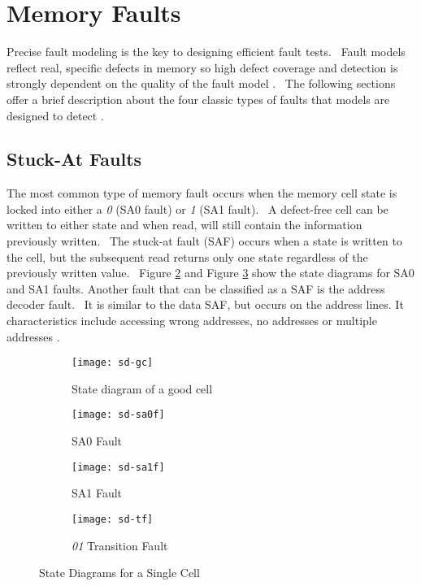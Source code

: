 \section{Memory Faults}
\label{sect:bg-faults}
Precise fault modeling is the key to designing efficient fault tests.  Fault models reflect real, specific defects in memory so high defect coverage and detection is strongly dependent on the quality of the fault model \cite{1327984}.  The following sections offer a brief description about the four classic types of faults that models are designed to detect \cite{Adams2003}.  

\subsection{Stuck-At Faults}
The most common type of memory fault occurs when the memory cell state is locked into either a \textit{0} (SA0 fault) or \textit{1} (SA1 fault).  A defect-free cell can be written to either state and when read, will still contain the information previously written.  The stuck-at fault (SAF) occurs when a state is written to the cell, but the subsequent read returns only one state regardless of the previously written value.  Figure \ref{fig:sd-sa0f} and Figure \ref{fig:sd-sa1f} show the state diagrams for SA0 and SA1 faults.  Another fault that can be classified as a SAF is the address decoder fault.  It is similar to the data SAF, but occurs on the address lines.  It characteristics include accessing wrong addresses, no addresses or multiple addresses \cite{VanDeGoor1991}.
\begin{figure}[H]
  \centering
  \begin{subfigure}[b]{0.5\textwidth}
    \texttt{[image: sd-gc]}
    \caption{State diagram of a good cell}
    \label{fig:sd-gc}
  \end{subfigure}  
  
  \begin{subfigure}[b]{0.25\textwidth}
    \texttt{[image: sd-sa0f]}
    \caption{SA0 Fault}
    \label{fig:sd-sa0f}
  \end{subfigure}  
  \begin{subfigure}[b]{0.25\textwidth}
    \texttt{[image: sd-sa1f]}
    \caption{SA1 Fault}
    \label{fig:sd-sa1f}
  \end{subfigure}  
  
  \begin{subfigure}[b]{0.5\textwidth}
    \texttt{[image: sd-tf]}
    \caption{\textit{01} Transition Fault}
    \label{fig:sd-tf}
  \end{subfigure}  

  \caption{State Diagrams for a Single Cell \cite{VanDeGoor1991}}
  \label{fig:sd-sc}
\end{figure}

